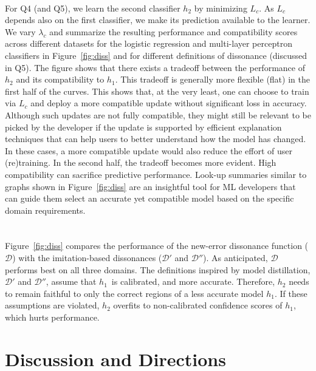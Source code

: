 \documentclass[letterpaper]{article} %
\newcommand{\?}{\mbox{?}}
\newcommand{\hone}{\mbox{$h_1$}}
\newcommand{\htwo}{\mbox{$h_2$}}
\newcommand{\loss}{L}
\newcommand{\lossbc}{\loss_c}
\newcommand{\lambdabc}{\lambda_c}
\newcommand{\dissonance}{\mathcal{D}}
\begin{document}
\\
\noindent For Q4 (and Q5), we learn the second classifier $\htwo$ by minimizing $\lossbc$. As $\lossbc$ depends also on the first classifier, we make its prediction available to the learner. We vary $\lambdabc$ and summarize the resulting performance and compatibility scores across different datasets for the logistic regression and multi-layer perceptron classifiers in Figure~\ref{fig:diss} and for different definitions of dissonance (discussed in Q5). 
The figure shows that there exists a tradeoff between the performance of $\htwo$ and its compatibility to $\hone$. This tradeoff is generally more flexible (flat) in the first half of the curves. This shows that, at the very least, one can choose to train via $\lossbc$ and deploy a more compatible update without significant loss in accuracy. Although such updates are not fully compatible, they might still be relevant to be picked by the developer if the update is supported by efficient explanation techniques that can help users to better understand how the model has changed. In these cases, a more compatible update would also reduce the effort of user (re)training. In the second half, the tradeoff becomes more evident. High compatibility can sacrifice predictive performance. Look-up summaries similar to graphs shown in Figure~\ref{fig:diss} are an insightful tool for ML developers that can guide them select an accurate yet compatible model based on the specific domain requirements. \\\\

\\
 Figure~\ref{fig:diss} compares the performance of the new-error dissonance function ($\dissonance$) with the imitation-based dissonances ($\dissonance'$  and  $\dissonance''$). As anticipated, $\dissonance$ performs  best on all  three domains. The definitions inspired by model distillation, $\dissonance'$ and $\dissonance''$,  assume that \hone\ is calibrated, and more accurate. Therefore, $\htwo$ needs to remain faithful to only the correct regions of a less accurate model $\hone$. If these assumptions are violated, $\htwo$ overfits to non-calibrated confidence scores of $\hone$, which hurts performance.


\section{Discussion and Directions}
\end{document}
